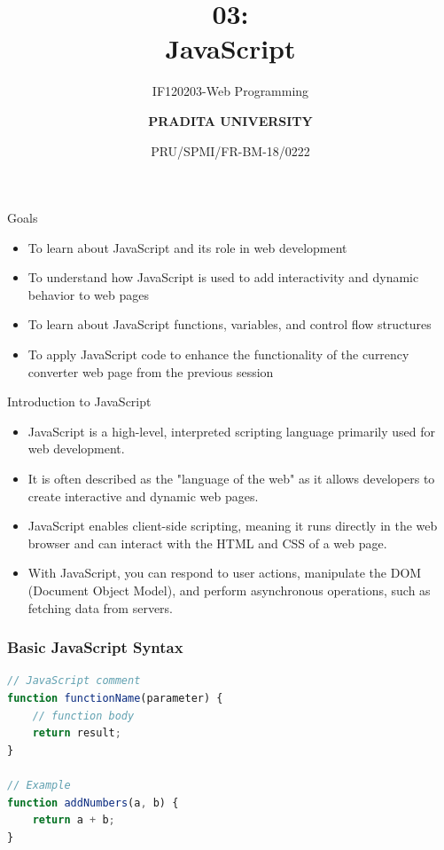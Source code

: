 \documentclass[aspectratio=169, table]{beamer}
\subtitle{IF120203-Web Programming}
\title{\Huge {\textbf{03: \\JavaScript}}}
\date[Serial]{\scriptsize {PRU/SPMI/FR-BM-18/0222}}
\author[Pradita]{\small {\textbf{PRADITA UNIVERSITY}}}
\begin{document}
\begin{frame}
    \titlepage
\end{frame}

\begin{frame}{Goals}
    \vskip-1cm
    \begin{itemize}
        \item To learn about JavaScript and its role in web development
        \item To understand how JavaScript is used to add interactivity and dynamic behavior to web pages
        \item To learn about JavaScript functions, variables, and control flow structures
        \item To apply JavaScript code to enhance the functionality of the currency converter web page from the previous session
    \end{itemize}
\end{frame}

\begin{frame}{Introduction to JavaScript}
    \vskip-0.5cm
    \begin{itemize}
        \item JavaScript is a high-level, interpreted scripting language primarily used for web development.
        \item It is often described as the "language of the web" as it allows developers to create interactive and dynamic web pages.
        \item JavaScript enables client-side scripting, meaning it runs directly in the web browser and can interact with the HTML and CSS of a web page.
        \item With JavaScript, you can respond to user actions, manipulate the DOM (Document Object Model), and perform asynchronous operations, such as fetching data from servers.
    \end{itemize}
\end{frame}

\begin{frame}[fragile] %
    \frametitle{Basic JavaScript Syntax}
    \vskip0.5cm
    \begin{lstlisting}[language=JavaScript]
// JavaScript comment
function functionName(parameter) {
    // function body
    return result;
}

// Example
function addNumbers(a, b) {
    return a + b;
}
    \end{lstlisting}
\end{frame}
\end{document}
